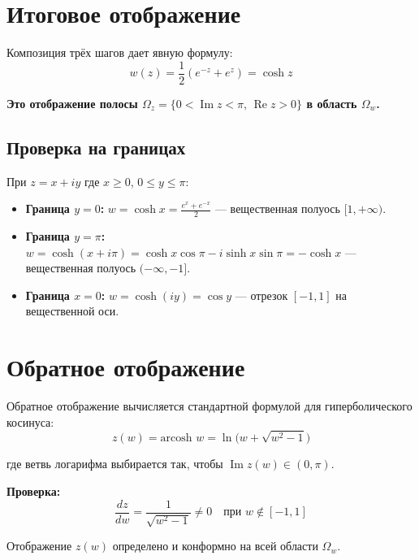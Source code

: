 \documentclass[12pt,a4paper]{article}
\begin{document}
\section{Итоговое отображение}

Композиция трёх шагов дает явную формулу:
\begin{equation}
w(z) = \frac{1}{2}\left(e^{-z} + e^{z}\right) = \cosh z
\end{equation}

\textbf{Это отображение полосы $\Omega_z = \{0 < \operatorname{Im} z < \pi,\, \operatorname{Re} z > 0\}$ в область $\Omega_w$.}

\subsection{Проверка на границах}

При $z = x + iy$ где $x \geq 0$, $0 \leq y \leq \pi$:

\begin{itemize}
    \item \textbf{Граница $y = 0$:} $w = \cosh x = \frac{e^x + e^{-x}}{2}$ — вещественная полуось $[1, +\infty)$.
    
    \item \textbf{Граница $y = \pi$:} $w = \cosh(x + i\pi) = \cosh x \cos \pi - i \sinh x \sin \pi = -\cosh x$ — вещественная полуось $(-\infty, -1]$.
    
    \item \textbf{Граница $x = 0$:} $w = \cosh(iy) = \cos y$ — отрезок $[-1, 1]$ на вещественной оси.
\end{itemize}

\section{Обратное отображение}

Обратное отображение вычисляется стандартной формулой для гиперболического косинуса:
\begin{equation}
z(w) = \text{arcosh } w = \ln\bigl(w + \sqrt{w^2 - 1}\bigr)
\end{equation}

где ветвь логарифма выбирается так, чтобы $\operatorname{Im} z(w) \in (0, \pi)$.

\textbf{Проверка:}
\[
\frac{dz}{dw} = \frac{1}{\sqrt{w^2 - 1}} \neq 0 \quad \text{при } w \notin [-1, 1]
\]

Отображение $z(w)$ определено и конформно на всей области $\Omega_w$.
\end{document}
